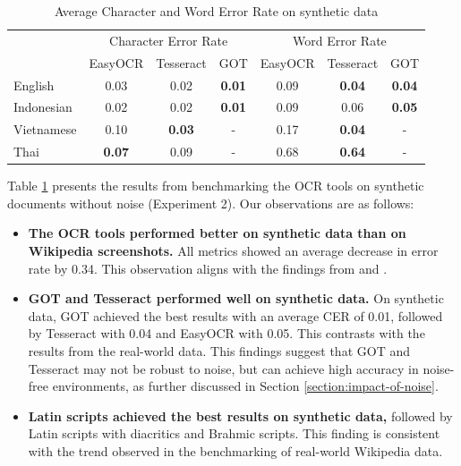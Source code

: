 \documentclass[12pt,oneside]{memoir}
\begin{document}
\begin{table}[ht]
    \centering
    \caption{Average Character and Word Error Rate on synthetic data}
    \label{table:ocr-accuracy-on-synthetic-data}
    \begin{tabular}{lcccccc}
        \toprule
        & \multicolumn{3}{c}{Character Error Rate} & \multicolumn{3}{c}{Word Error Rate}\\
        \cmidrule(lr){2-4}\cmidrule(lr){5-7}
        & EasyOCR & Tesseract & GOT & EasyOCR & Tesseract & GOT\\
        \midrule
        English & 0.03 & 0.02 & \textbf{0.01} & 0.09 & \textbf{0.04} & \textbf{0.04}\\
        Indonesian & 0.02 & 0.02 & \textbf{0.01} & 0.09 & 0.06 & \textbf{0.05}\\
        Vietnamese & 0.10 & \textbf{0.03} & - & 0.17 & \textbf{0.04} & -\\
        Thai & \textbf{0.07} & 0.09 & - & 0.68 & \textbf{0.64} & -\\
        \bottomrule
    \end{tabular}
\end{table}

Table \ref{table:ocr-accuracy-on-synthetic-data} presents the results from benchmarking the OCR tools on synthetic documents without noise (Experiment 2). Our observations are as follows:

\begin{itemize}
    \item \textbf{The OCR tools performed better on synthetic data than on Wikipedia screenshots.} All metrics showed an average decrease in error rate by 0.34. This observation aligns with the findings from \textcite{ignat-etal-2022} and \textcite{hegghammer-2022}.
    \item \textbf{GOT and Tesseract performed well on synthetic data.} 
    On synthetic data, GOT achieved the best results with an average CER of 0.01, followed by Tesseract with 0.04 and EasyOCR with 0.05.
    This contrasts with the results from the real-world data.
    This findings suggest that GOT and Tesseract may not be robust to noise, but can achieve high accuracy in noise-free environments, as further discussed in Section \ref{section:impact-of-noise}.
    \item \textbf{Latin scripts achieved the best results on synthetic data,} followed by Latin scripts with diacritics and Brahmic scripts. This finding is consistent with the trend observed in the benchmarking of real-world Wikipedia data.
\end{itemize}
\end{document}
